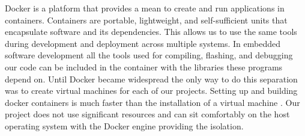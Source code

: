 Docker is a platform that provides a mean to create and run applications in containers. Containers are portable, lightweight, and self-sufficient units that encapsulate software and its dependencies. This allows us to use the same tools during development and deployment across multiple systems. In embedded software development all the tools used for compiling, flashing, and debugging our code can be included in the container with the libraries these programs depend on. Until Docker became widespread the only way to do this separation was to create virtual machines for each of our projects. Setting up and building docker containers is much faster than the installation of a virtual machine \cite{VMVsDocker}. Our project does not use significant resources and can sit comfortably on the host operating system with the Docker engine providing the isolation.
